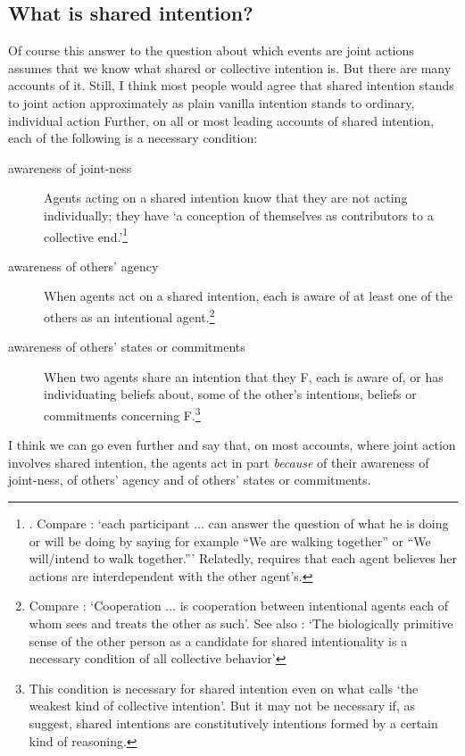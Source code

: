 \documentclass[12pt,\papersize]{extarticle}
\begin{document}
\subsection{What is shared intention?}
Of course this answer to the question about which events are joint actions assumes that we know what shared or collective intention is.
But there are many accounts of it.
Still, I think most people would agree that shared intention stands to joint action approximately as plain vanilla intention stands to ordinary, individual action
Further,
on all or most leading accounts of shared intention, each of the following is a necessary condition:

\begin{description}

\item[awareness of joint-ness] Agents acting on a shared intention know that they are not acting individually; they have `a conception of themselves as contributors to a collective end.'\footnote{
	\citet[p.\ 10]{Kutz:2000si}.  Compare \citet[p.\ 361]{Roth:2004ki}: `each participant ... can answer the question of what he is doing or will be doing by saying for example ``We are walking together'' or ``We will/intend to walk together.''' 
Relatedly, \citet[p. 56]{miller_social_2001} requires that each agent believes her actions are interdependent with the other agent's.
}

\item[awareness of others' agency]  When agents act on a shared intention, each is aware of at least one of the others as an intentional agent.\footnote{
	Compare \citet[p.\ 333]{Bratman:1992mi}: `Cooperation ... is cooperation between intentional agents each of whom sees and treats the other as such'.  See also \citet[p.\ 105]{Searle:1990em}: `The biologically primitive sense of the other person as a candidate for shared intentionality is a necessary condition of all collective behavior' 
}

\item[awareness of others' states or commitments] When two agents share an intention that they F, each is aware of, or has individuating beliefs about, some of the other's intentions, beliefs or commitments concerning F.\footnote{
This condition is necessary for shared intention even on what \citet[p.\ 40]{tuomela_collective_2000} calls `the weakest kind of collective intention'.  But it may not be necessary if, as \citet{Gold:2007zd} suggest, shared intentions are constitutively intentions formed by a certain kind of reasoning.
}

\end{description}
%
I think we can go even further and say that, 
on most accounts,
where joint action involves shared intention, the agents act in part \emph{because} of their awareness of joint-ness, of others' agency and of others' states or commitments.  
\end{document}
